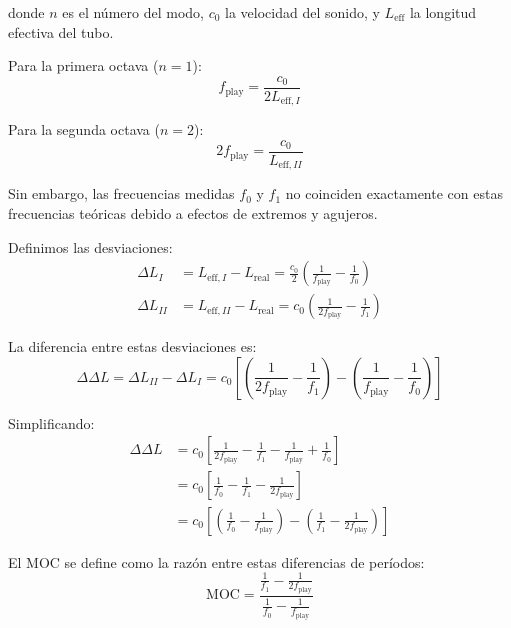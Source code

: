 \documentclass[12pt,a4paper,twocolumn]{article}
\newcommand{\freqzero}{f_0}
\newcommand{\freqone}{f_1}
\newcommand{\freqplay}{f_{\text{play}}}
\begin{document}
donde $n$ es el número del modo, $c_0$ la velocidad del sonido, y $L_{\text{eff}}$ la longitud efectiva del tubo.

Para la primera octava ($n=1$):
\begin{equation}
\freqplay = \frac{c_0}{2 L_{\text{eff},I}}
\label{eq:freq_play_I}
\end{equation}

Para la segunda octava ($n=2$):
\begin{equation}
2\freqplay = \frac{c_0}{L_{\text{eff},II}}
\label{eq:freq_play_II}
\end{equation}

Sin embargo, las frecuencias medidas $\freqzero$ y $\freqone$ no coinciden exactamente con estas frecuencias teóricas debido a efectos de extremos y agujeros.

Definimos las desviaciones:
\begin{align}
\Delta L_I &= L_{\text{eff},I} - L_{\text{real}} = \frac{c_0}{2}\left(\frac{1}{\freqplay} - \frac{1}{\freqzero}\right) \\
\Delta L_{II} &= L_{\text{eff},II} - L_{\text{real}} = c_0\left(\frac{1}{2\freqplay} - \frac{1}{\freqone}\right)
\label{eq:desviaciones_longitud}
\end{align}

La diferencia entre estas desviaciones es:
\begin{equation}
\Delta\Delta L = \Delta L_{II} - \Delta L_I = c_0\left[\left(\frac{1}{2\freqplay} - \frac{1}{\freqone}\right) - \left(\frac{1}{\freqplay} - \frac{1}{\freqzero}\right)\right]
\label{eq:delta_delta_L}
\end{equation}

Simplificando:
\begin{align}
\Delta\Delta L &= c_0\left[\frac{1}{2\freqplay} - \frac{1}{\freqone} - \frac{1}{\freqplay} + \frac{1}{\freqzero}\right] \\
&= c_0\left[\frac{1}{\freqzero} - \frac{1}{\freqone} - \frac{1}{2\freqplay}\right] \\
&= c_0\left[\left(\frac{1}{\freqzero} - \frac{1}{\freqplay}\right) - \left(\frac{1}{\freqone} - \frac{1}{2\freqplay}\right)\right]
\label{eq:delta_delta_L_simplificado}
\end{align}

El MOC se define como la razón entre estas diferencias de períodos:
\begin{equation}
\text{MOC} = \frac{\frac{1}{\freqone} - \frac{1}{2\freqplay}}{\frac{1}{\freqzero} - \frac{1}{\freqplay}}
\label{eq:moc_def}
\end{equation}
\end{document}
